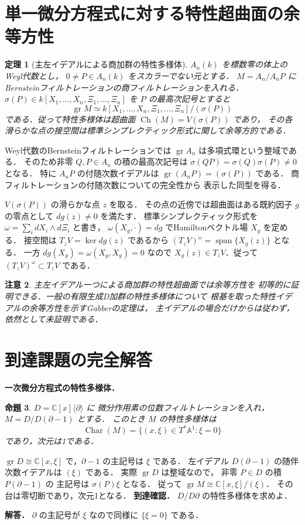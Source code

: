 \documentclass[a5paper,10pt,onecolumn]{jsarticle}
\makeatletter
\theoremstyle{mathnotetheorem}
\newtheorem{theorem}{定理}[section]
\newtheorem{proposition}[theorem]{命題}
\newtheorem{remark}[theorem]{注意}
\renewcommand{\proofname}{証明}
\renewenvironment{proof}[1][\proofname]{%
  \par\pushQED{\qed}\normalfont\topsep4\p@\@plus2\p@\relax
  \trivlist\item[\hskip\labelsep\bfseries #1]\ignorespaces
}{\popQED\endtrivlist\@endpefalse}
\makeatother
\begin{document}
\section{単一微分方程式に対する特性超曲面の余等方性}
\begin{theorem}[主左イデアルによる商加群の特性多様体]
$A_n(k)$ を標数零の体上のWeyl代数とし，
$0\ne P\in A_n(k)$ をスカラーでない元とする．
$M=A_n/A_nP$ にBernsteinフィルトレーションの商フィルトレーションを入れる．
$\sigma(P)\in k[X_1,\ldots,X_n,\Xi_1,\ldots,\Xi_n]$
を $P$ の最高次記号とすると
\[
 \operatorname{gr}M\simeq
 k[X_1,\ldots,X_n,\Xi_1,\ldots,\Xi_n]/(\sigma(P))
\]
である．従って特性多様体は超曲面
$\operatorname{Ch}(M)=V(\sigma(P))$ であり，
その各滑らかな点の接空間は標準シンプレクティック形式に関して余等方的である．
\end{theorem}
\begin{proof}
Weyl代数のBernsteinフィルトレーションでは
$\operatorname{gr}A_n$ は多項式環という整域である．
そのため非零 $Q,P\in A_n$ の積の最高次記号は
$\sigma(QP)=\sigma(Q)\sigma(P)\ne0$ となる．
特に $A_nP$ の付随次数イデアルは
$\operatorname{gr}(A_nP)=(\sigma(P))$ である．
商フィルトレーションの付随次数についての完全性から
表示した同型を得る．

$V(\sigma(P))$ の滑らかな点 $z$ を取る．
その点の近傍では超曲面はある既約因子 $g$ の零点として
$dg(z)\ne0$ を満たす．
標準シンプレクティック形式を
$\omega=\sum_i dX_i\wedge d\Xi_i$ と書き，
$\omega(X_g,\cdot)=dg$ でHamiltonベクトル場 $X_g$ を定める．
接空間は $T_zV=\ker dg(z)$ であるから
$(T_zV)^\omega=\operatorname{span}\{X_g(z)\}$ となる．
一方 $dg(X_g)=\omega(X_g,X_g)=0$ なので
$X_g(z)\in T_zV$．従って
$(T_zV)^\omega\subset T_zV$ である．
\end{proof}
\begin{remark}
主左イデアル一つによる商加群の特性超曲面では余等方性を
初等的に証明できる．一般の有限生成D加群の特性多様体について
根基を取った特性イデアルの余等方性を示すGabberの定理は，
主イデアルの場合だけからは従わず，依然として未証明である．
\end{remark}


\section{到達課題の完全解答}
\noindent\textbf{一次微分方程式の特性多様体．}
\begin{proposition}
$D=\mathbb C[x]\langle\partial\rangle$ に
微分作用素の位数フィルトレーションを入れ，
$M=D/D(\partial-1)$ とする．
このとき $M$ の特性多様体は
\[
\operatorname{Char}(M)=\{(x,\xi)\in T^*\mathbb A^1:
\xi=0\}
\]
であり，次元は1である．
\end{proposition}
\begin{proof}
$\operatorname{gr}D\cong\mathbb C[x,\xi]$
で，$\partial-1$ の主記号は $\xi$ である．
左イデアル $D(\partial-1)$ の随伴次数イデアルは
$(\xi)$ である．
実際 $\operatorname{gr}D$ は整域なので，
非零 $P\in D$ の積 $P(\partial-1)$ の
主記号は $\sigma(P)\xi$ となる．
従って
$\operatorname{gr}M\cong\mathbb C[x,\xi]/(\xi)$．
その台は零切断であり，次元1となる．
\end{proof}
\noindent\textbf{到達確認．}
$D/D\partial$ の特性多様体を求めよ．
\par\noindent\textbf{解答．}
$\partial$ の主記号が $\xi$ なので同様に
$\{\xi=0\}$ である．
\end{document}
